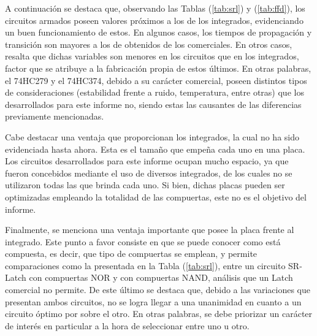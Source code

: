 A continuación se destaca que, observando las Tablas (\ref{tab:srl}) y (\ref{tab:ffd}), los circuitos armados poseen valores próximos a los de los integrados, evidenciando un buen funcionamiento de estos. En algunos casos, los tiempos de propagación y transición son mayores a los de obtenidos de los comerciales. En otros casos, resalta que dichas variables son menores en los circuitos que en los integrados, factor que se atribuye a la fabricación propia de estos últimos. En otras palabras, el 74HC279 y el 74HC374, debido a su carácter comercial, poseen distintos tipos de consideraciones (estabilidad frente a ruido, temperatura, entre otras) que los desarrollados para este informe no, siendo estas las causantes de las diferencias previamente mencionadas.

Cabe destacar una ventaja que proporcionan los integrados, la cual no ha sido evidenciada hasta ahora. Esta es el tamaño que empeña cada uno en una placa. Los circuitos desarrollados para este informe ocupan mucho espacio, ya que fueron concebidos mediante el uso de diversos integrados, de los cuales no se utilizaron todas las que brinda cada uno. Si bien, dichas placas pueden ser optimizadas empleando la totalidad de las compuertas, este no es el objetivo del informe.

Finalmente, se menciona una ventaja importante que posee la placa frente al integrado. Este punto a favor consiste en que se puede conocer como está compuesta, es decir, que tipo de compuertas se emplean, y permite comparaciones como la presentada en la Tabla (\ref{tab:srl}), entre un circuito SR-Latch con compuertas NOR y con compuertas NAND, análisis que un Latch comercial no permite. De este último se destaca que, debido a las variaciones que presentan ambos circuitos, no se logra llegar a una unanimidad en cuanto a un circuito óptimo por sobre el otro. En otras palabras, se debe priorizar un carácter de interés en particular a la hora de seleccionar entre uno u otro.